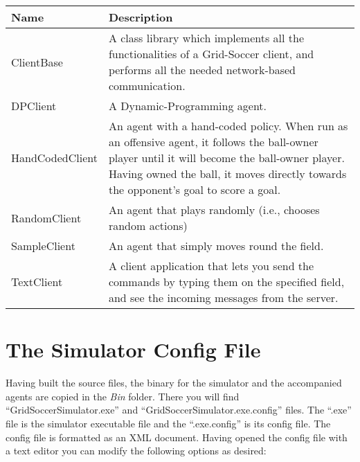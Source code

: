 \documentclass[12pt,titlepage,a4paper]{article}
\begin{document}
\begin{tabular}{l|p{9cm}}
Name & Description \\ \hline
ClientBase & A class library which implements all the functionalities of a Grid-Soccer client, and performs all the needed network-based communication. \\
DPClient & A Dynamic-Programming agent.\\
HandCodedClient & An agent with a hand-coded policy. When run as an offensive agent, it follows the ball-owner player until it will become the ball-owner player. Having owned the ball, it moves directly towards the opponent's goal to score a goal.\\
RandomClient & An agent that plays randomly (i.e., chooses random actions)\\
SampleClient & An agent that simply moves round the field. \\
TextClient & A client application that lets you send the commands by typing them on the specified field, and see the incoming messages from the server.
\end{tabular}
\vspace{1cm}

\section{The Simulator Config File}

Having built the source files, the binary for the simulator and the accompanied agents are copied in the \emph{Bin} folder. There you will find ``GridSoccerSimulator.exe'' and ``GridSoccerSimulator.exe.config'' files. The ``.exe'' file is the simulator executable file and the ``.exe.config'' is its config file. The config file is formatted as an XML document. Having opened the config file with a text editor you can modify the following options as desired:

\vspace{1cm}
\end{document}
